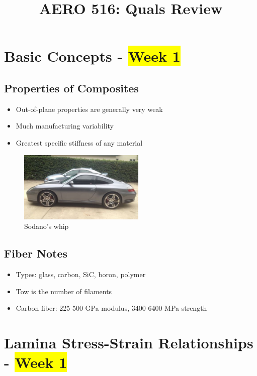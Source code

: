 \documentclass[11pt]{article}
\title{\vspace{-2cm}AERO 516: Quals Review\vspace{-1.0cm}}
\begin{document}
    \maketitle

    \section{Basic Concepts - \colorbox{Yellow}{Week 1}}
    \subsection{Properties of Composites}
    \begin{itemize}
        \item{Out-of-plane properties are generally very weak}
        \item{Much manufacturing variability}
        \item{Greatest specific stiffness of any material}
    \end{itemize}

    \begin{figure}[H]
        \includegraphics[width=6cm]{porsche}\centering
        \caption{Sodano's whip}
        \label{fig:1}
    \end{figure}

    \subsection{Fiber Notes}
    \begin{itemize}
        \item{Types: glass, carbon, SiC, boron, polymer}
        \item{Tow is the number of filaments}
        \item{Carbon fiber: 225-500 GPa modulus, 3400-6400 MPa strength}
    \end{itemize}

    \section{Lamina Stress-Strain Relationships - \colorbox{Yellow}{Week 1}}
\end{document}
